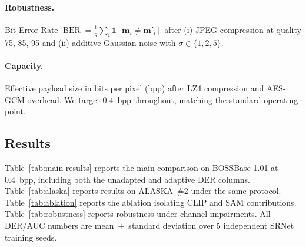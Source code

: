 \documentclass[10pt,a4paper]{article}
\newcommand{\msg}{\mathbf{m}}
\DeclareMathOperator{\BERm}{BER}
\begin{document}
\paragraph{Robustness.} Bit Error Rate
$\BERm = \tfrac{1}{q} \sum_{i} \mathbb{1}[\msg_i \neq \msg'_i]$
after (i) JPEG compression at quality 75, 85, 95 and (ii) additive
Gaussian noise with $\sigma \in \{1, 2, 5\}$.

\paragraph{Capacity.} Effective payload size in bits per pixel (bpp)
after LZ4 compression and AES-GCM overhead.  We target 0.4~bpp
throughout, matching the standard operating point.

\subsection{Results}
\label{sec:exp-results}

Table~\ref{tab:main-results} reports the main comparison on BOSSBase
1.01 at 0.4~bpp, including both the unadapted and adaptive DER columns.
Table~\ref{tab:alaska} reports results on ALASKA~\#2 under the same
protocol. Table~\ref{tab:ablation} reports the ablation isolating CLIP
and SAM contributions. Table~\ref{tab:robustness} reports robustness
under channel impairments. All DER/AUC numbers are
mean~$\pm$~standard deviation over 5 independent SRNet training seeds.
\end{document}
